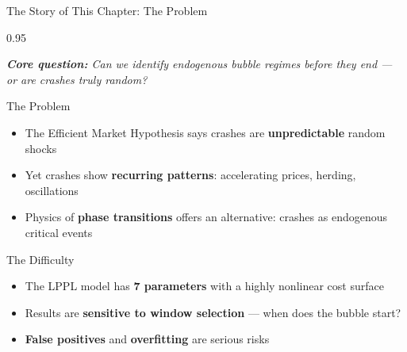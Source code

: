 \documentclass[9pt, aspectratio=169, t]{beamer}
\begin{document}
\begin{frame}{The Story of This Chapter: The Problem}
    \begin{cminipage}{0.95\textwidth}
    {\footnotesize
    \textit{\textbf{Core question:} Can we identify endogenous bubble regimes before they end --- or are crashes truly random?}
    \vspace{0.2cm}
    \begin{block}{The Problem}
        \begin{itemize}\setlength{\itemsep}{2pt}
            \item The Efficient Market Hypothesis says crashes are \textbf{unpredictable} random shocks
            \item Yet crashes show \textbf{recurring patterns}: accelerating prices, herding, oscillations
            \item Physics of \textbf{phase transitions} offers an alternative: crashes as endogenous critical events
        \end{itemize}
    \end{block}
    \vspace{0.1cm}
    \begin{alertblock}{The Difficulty}
        \begin{itemize}\setlength{\itemsep}{2pt}
            \item The LPPL model has \textbf{7 parameters} with a highly nonlinear cost surface
            \item Results are \textbf{sensitive to window selection} --- when does the bubble start?
            \item \textbf{False positives} and \textbf{overfitting} are serious risks
        \end{itemize}
    \end{alertblock}
    }
    \end{cminipage}
\end{frame}
\end{document}
